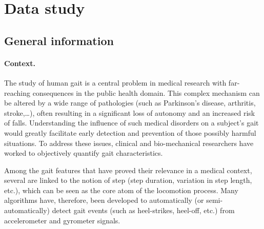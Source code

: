 \documentclass[11pt]{article}
\begin{document}
\section{Data study}

\subsection{General information}

\paragraph{Context.}
The study of human gait is a central problem in medical research with far-reaching consequences in the public health domain. This complex mechanism can be altered by a wide range of pathologies (such as Parkinson's disease, arthritis, stroke,\ldots), often resulting in a significant loss of autonomy and an increased risk of falls. Understanding the influence of such medical disorders on a subject's gait would greatly facilitate early detection and prevention of those possibly harmful situations. To address these issues, clinical and bio-mechanical researchers have worked to objectively quantify gait characteristics.

Among the gait features that have proved their relevance in a medical context, several are linked to the notion of step (step duration, variation in step length, etc.), which can be seen as the core atom of the locomotion process. Many algorithms have, therefore, been developed to automatically (or semi-automatically) detect gait events (such as heel-strikes, heel-off, etc.) from accelerometer and gyrometer signals.
\end{document}
